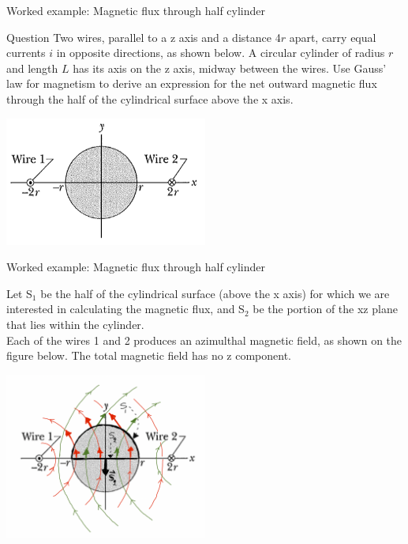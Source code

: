{
\problemslide

%
%
%

\begin{frame}{Worked example: Magnetic flux through half cylinder}

  \begin{blockexmplque}{Question}
    Two wires, parallel to a z axis and a distance 4$r$ apart,
    carry equal currents $i$ in opposite directions, as shown below.
    A circular cylinder of radius $r$ and length $L$ has its axis on the z axis,
    midway between the wires. Use Gauss' law for magnetism to derive an expression
    for the net outward magnetic flux through the half of the cylindrical
    surface above the x axis.\\
    \begin{center}
        \includegraphics[width=0.50\textwidth]{./images/problems/lect06_2_wires_magnetic_flux_half_cylinder}
    \end{center}
  \end{blockexmplque}

\end{frame}

%
%
%

\begin{frame}{Worked example: Magnetic flux through half cylinder}

  Let S$_1$ be the half of the cylindrical surface (above the x axis) for which
  we are interested in calculating the magnetic flux, and
  S$_2$ be the portion of the xz plane that lies within the cylinder.\\
  \vspace{0.2cm}
  Each of the wires 1 and 2 produces an azimulthal magnetic field, as shown on
  the figure below. The total magnetic field has no z component.

  \begin{center}
      \includegraphics[width=0.50\textwidth]{./images/problems/lect06_2_wires_magnetic_flux_half_cylinder_2}
  \end{center}


\end{frame}}
